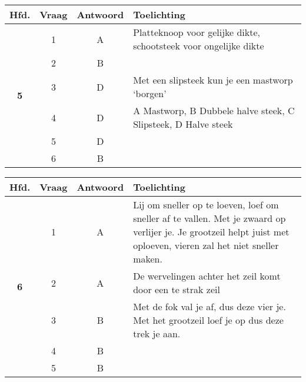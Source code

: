 \begin{table}[h]
	\centering
	\begin{tabular}{c|c|c|m{9.5cm}}
		\textbf{Hfd.}       & \textbf{Vraag} & \textbf{Antwoord} & \textbf{Toelichting} \\ \hline 
		\multirow{7}{*}{\sffamily\bfseries{\textcolor{ocre}{\LARGE5}} } & 1 & A & Platteknoop voor gelijke dikte, schootsteek voor ongelijke dikte \\ \cline{2-4} 
		& 2 & B &  \\ \cline{2-4} 
		& 3 & D & Met een slipsteek kun je een mastworp `borgen' \\ \cline{2-4} 
		& 4 & D & A Mastworp, B Dubbele halve steek, C Slipsteek, D Halve steek\\ \cline{2-4} 
		& 5 & D &  \\ \cline{2-4} 
		& 6 & B &  \\ 
	\end{tabular}
\end{table}


\begin{table}[h]
	\centering
	\begin{tabular}{c|c|c|m{9.5cm}}
		\textbf{Hfd.}       & \textbf{Vraag} & \textbf{Antwoord} & \textbf{Toelichting} \\ \hline 
		\multirow{6}{*}{\sffamily\bfseries{\textcolor{ocre}{\LARGE6}} }  & 1 & A & Lij om sneller op te loeven, loef om sneller af te vallen. Met je zwaard op verlijer je. Je grootzeil helpt juist met oploeven, vieren zal het niet sneller maken.  \\ \cline{2-4} 
		& 2 & A & De wervelingen achter het zeil komt door een te strak zeil \\ \cline{2-4} 
		& 3 & B & Met de fok val je af, dus deze vier je. Met het grootzeil loef je op dus deze trek je aan.  \\ \cline{2-4} 
		& 4 & B &  \\ \cline{2-4} 
		& 5 & B & 
	\end{tabular}
\end{table}

